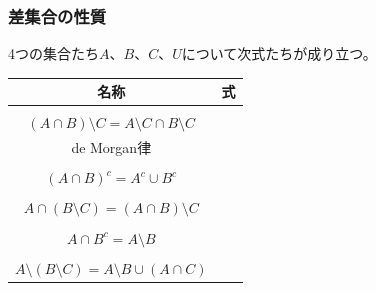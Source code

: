 \documentclass[a4paper]{jsarticle}
\begin{document}
\subsubsection{差集合の性質}%
\begin{thm}
\label{1.2.2.3}
4つの集合たち$A$、$B$、$C$、$U$について次式たちが成り立つ。
\begin{longtable}[c]{|c|c|}
\hline
名称 & 式\\
\hline \hline
& \hspace{-0.5em}\begin{tabular}{c}
  $(A \cup B) \setminus C = A \setminus C \cup B \setminus C$\\
  $(A \cap B) \setminus C = A \setminus C \cap B \setminus C$ \end{tabular}\\
\hline
\multirow{2}{*}{de Morgan律} & \hspace{-0.5em}\begin{tabular}{c}
  $A \setminus (B \cup C) = A \setminus B \cap A \setminus C$\\
  $A \setminus (B \cap C) = A \setminus B \cup A \setminus C$ \end{tabular} \\ \cline{2-2}
& \hspace{-0.5em}\begin{tabular}{c}
  $(A \cup B)^{c} = A^{c} \cap B^{c}$\\
  $(A \cap B)^{c} = A^{c} \cup B^{c}$ \end{tabular} \\
\hline
& \hspace{-0.5em}\begin{tabular}{c}
  $A \cup (B \setminus C) = (A \cup B) \setminus (C \setminus A) $\\
  $A \cap (B \setminus C) = (A \cap B) \setminus C$ \end{tabular} \\ \cline{2-2}
& \hspace{-0.5em}\begin{tabular}{c}
  $A \cup B^{c} = (B \setminus A)^{c} $ \\
  $A \cap B^{c} = A \setminus B$ \end{tabular} \\
\hline
& \hspace{-0.5em}\begin{tabular}{c}
  $(A \setminus B) \setminus C = A \setminus (B \cup C) $\\
  $A \setminus (B \setminus C) = A \setminus B \cup (A \cap C) $\end{tabular} \\

\end{longtable}
\end{thm}
\end{document}
